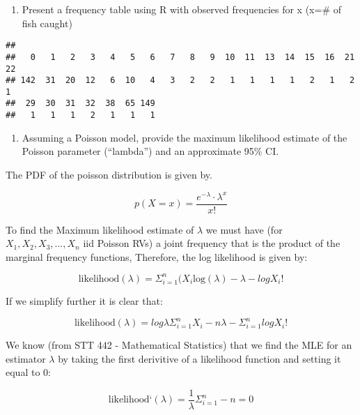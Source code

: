 \documentclass[]{article}
\newenvironment{Shaded}{\begin{snugshade}}{\end{snugshade}}
\newcommand{\KeywordTok}[1]{\textcolor[rgb]{0.13,0.29,0.53}{\textbf{#1}}}
\newcommand{\OperatorTok}[1]{\textcolor[rgb]{0.81,0.36,0.00}{\textbf{#1}}}
\newcommand{\NormalTok}[1]{#1}
\providecommand{\tightlist}{%
  \setlength{\itemsep}{0pt}\setlength{\parskip}{0pt}}
\begin{document}
\begin{enumerate}
\def\labelenumi{\alph{enumi})}
\tightlist
\item
  Present a frequency table using R with observed frequencies for x
  (x=\# of fish caught)
\end{enumerate}

\begin{Shaded}
\end{Shaded}

\begin{verbatim}
## 
##   0   1   2   3   4   5   6   7   8   9  10  11  13  14  15  16  21  22 
## 142  31  20  12   6  10   4   3   2   2   1   1   1   1   2   1   2   1 
##  29  30  31  32  38  65 149 
##   1   1   1   2   1   1   1
\end{verbatim}

\begin{enumerate}
\def\labelenumi{\alph{enumi})}
\setcounter{enumi}{1}
\tightlist
\item
  Assuming a Poisson model, provide the maximum likelihood estimate of
  the Poisson parameter (``lambda'') and an approximate 95\% CI.
\end{enumerate}

The PDF of the poisson distribution is given by.

\[p(X = x)=\frac{e^{-\lambda} \cdot \lambda^{x}}{x !} \]

To find the Maximum likelihood estimate of \(\lambda\) we must have (for
\(X_1,X_2,X_3,...,X_n\) iid Poisson RVs) a joint frequency that is the
product of the marginal frequency functions, Therefore, the log
likelihood is given by:

\[ \text{likelihood}(\lambda) = \Sigma_{i=1}^n (X_i \text{log}(\lambda) - \lambda - logX_i!\]

If we simplify further it is clear that:

\[ \text{likelihood}(\lambda) = log\lambda\Sigma_{i=1}^n X_i - n\lambda - \Sigma_{i=1}^n logX_i!\]

We know (from STT 442 - Mathematical Statistics) that we find the MLE
for an estimator \(\lambda\) by taking the first derivitive of a
likelihood function and setting it equal to 0:

\[ \text{likelihood`}(\lambda) = \frac{1}{\lambda} \Sigma_{i=1}^n - n = 0\]
\end{document}
